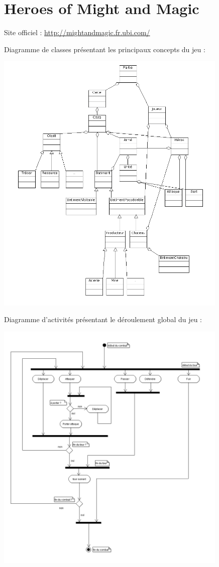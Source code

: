 \documentclass[a4paper,10pt]{report}
\begin{document}
	\section{Heroes of Might and Magic}
	
    Site officiel : \url{http://mightandmagic.fr.ubi.com/}

    Diagramme de classes présentant les principaux concepts du jeu : 
    
		\includegraphics[width=420px]{diagrammes/heroes_of_might_and_magic.png}

    Diagramme d'activités présentant le déroulement global du jeu : 
    
    \includegraphics[width=420px]{diagrammes/sequence-homm.png}
    
\end{document}
